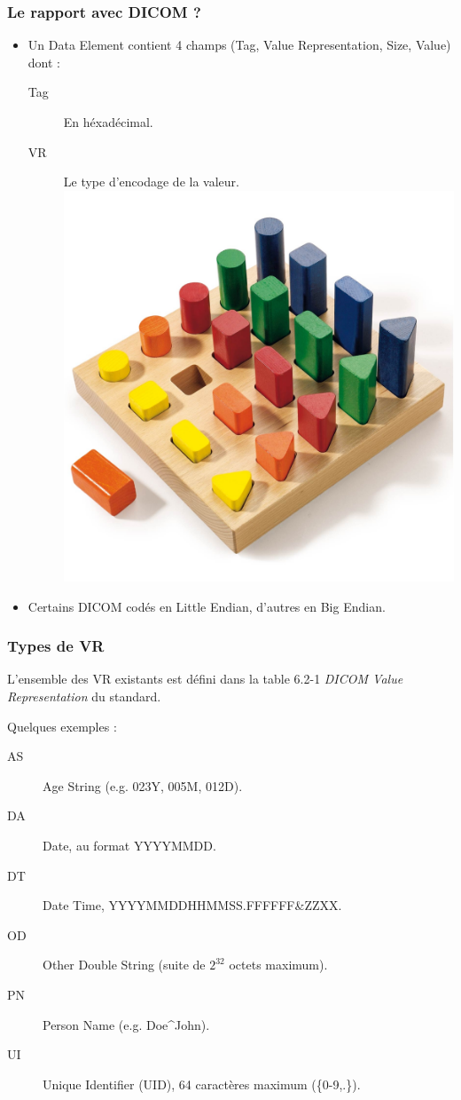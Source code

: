 \frame
{
    \frametitle{Le rapport avec DICOM ?}
    \begin{itemize}
        \item Un Data Element contient 4 champs (Tag, Value Representation, Size, Value) dont :
        \begin{description}
            \item[Tag] En h\'exad\'ecimal.
            \item[VR] Le type d'encodage de la valeur.\\
                \includegraphics[width=.5\linewidth]{./figures/types.jpg}
        \end{description}
        \item Certains DICOM cod\'es en Little Endian, d'autres en Big Endian. 
    \end{itemize}
}

\frame
{
    \frametitle{Types de VR}
    L'ensemble des VR existants est d\'efini dans la table 6.2-1 \emph{DICOM Value Representation} du standard.

    Quelques exemples :
    \begin{description}
        \item[AS] Age String (e.g. 023Y, 005M, 012D).
        \item[DA] Date, au format YYYYMMDD.
        \item[DT] Date Time, YYYYMMDDHHMMSS.FFFFFF\&{}ZZXX.
        \item[OD] Other Double String (suite de $2^{32}$ octets maximum).
        \item[PN] Person Name (e.g. Doe\^{}John).
        \item[UI] Unique Identifier (UID), 64 caract\`eres maximum (\{0-9,.\}).
    \end{description}
}

